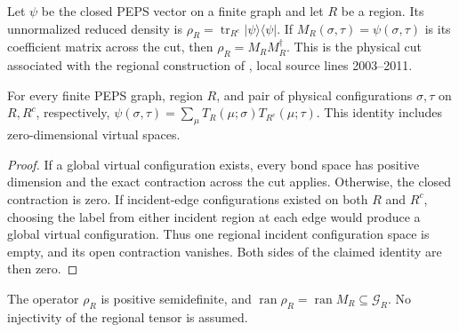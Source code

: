\begin{definition}%
    \label{def:peps_region_reduced_density}
    \leanok
    Let $\psi$ be the closed PEPS vector on a finite graph and let $R$ be
    a region. Its unnormalized reduced density is
    $\rho_R=\operatorname{tr}_{R^c}|\psi\rangle\langle\psi|$.
    If $M_R(\sigma,\tau)=\psi(\sigma,\tau)$ is its coefficient matrix
    across the cut, then $\rho_R=M_RM_R^\dagger$.
    This is the physical cut associated with the regional construction
    of \cite[Section~IV.C.1]{Cirac2021Matrix}, local source lines
    2003--2011.
\end{definition}

\begin{lemma}%
    \label{thm:peps_open_region_cut_unconditional}
    \leanok
    For every finite PEPS graph, region $R$, and pair of physical
    configurations $\sigma,\tau$ on $R,R^c$, respectively,
    $\psi(\sigma,\tau)=\sum_\mu T_R(\mu;\sigma)T_{R^c}(\mu;\tau)$.
    This identity includes zero-dimensional virtual spaces.
\end{lemma}

\begin{proof}\leanok
    If a global virtual configuration exists, every bond space has
    positive dimension and the exact contraction across the cut applies.
    Otherwise, the closed contraction is zero. If incident-edge
    configurations existed on both $R$ and $R^c$, choosing the label
    from either incident region at each edge would produce a global
    virtual configuration. Thus one regional incident configuration
    space is empty, and its open contraction vanishes. Both sides
    of the claimed identity are then zero.
\end{proof}

\begin{lemma}%
    \label{thm:peps_region_reduced_density_support}
    \leanok
    The operator $\rho_R$ is positive semidefinite, and
    $\operatorname{ran}\rho_R=\operatorname{ran}M_R
        \subseteq\mathcal G_R$.
    No injectivity of the regional tensor is assumed.
\end{lemma}

